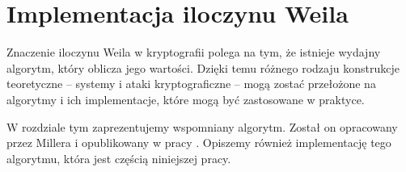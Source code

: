 \chapter{Implementacja iloczynu Weila}

\noindent
Znaczenie iloczynu Weila w kryptografii polega na tym,
że istnieje wydajny algorytm,
który oblicza jego wartości.
Dzięki temu różnego rodzaju konstrukcje teoretyczne --
systemy i ataki kryptograficzne --
mogą zostać przełożone na algorytmy i ich implementacje,
które mogą być zastosowane w praktyce.

\noindent
W rozdziale tym zaprezentujemy wspomniany algorytm.
Został on opracowany przez Millera i opublikowany w pracy \cite{miller}.
Opiszemy również implementację tego algorytmu,
która jest częścią niniejszej pracy.









